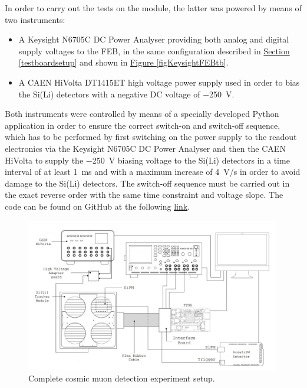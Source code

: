 \par
In order to carry out the tests on the module, the latter was powered by means of two instruments:

\begin{itemize}
    \itemsep0em
    \item A Keysight N6705C DC Power Analyser providing both analog and digital supply voltages to the FEB, in the same configuration described in \hyperref[testboardsetup]{Section \ref{testboardsetup}} and shown in \hyperref[figKeysightFEBtb]{Figure \ref{figKeysightFEBtb}}.
    \item A CAEN HiVolta DT1415ET high voltage power supply used in order to bias the Si(Li) detectors with a negative DC voltage of \SI{-250}{\volt}. 
\end{itemize}

\noindent
Both instruments were controlled by means of a specially developed Python application in order to ensure the correct switch-on and switch-off sequence, which has to be performed by first switching on the power supply to the readout electronics via the Keysight N6705C DC Power Analyser and then the CAEN HiVolta to supply the \SI{-250}{\volt} biasing voltage to the Si(Li) detectors in a time interval of at least \SI{1}{\milli\second} and with a maximum increase of \SI{4}{\volt/\second} in order to avoid damage to the Si(Li) detectors. The switch-off sequence must be carried out in the exact reverse order with the same time constraint and voltage slope. The code can be found on GitHub at the following \href{https://github.com/lucaghislo/GAPS_module_setup}{\underline{link}}.

\begin{figure}[h!]
    \centering
    \includegraphics[width=0.99\textwidth]{Images/chap3/test_setup_MODULE.jpg}
    \caption{Complete cosmic muon detection experiment setup.}
    \label{figModuleSetup}
\end{figure}

